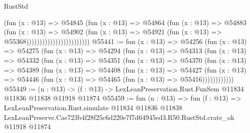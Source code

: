 \begin{lexlean}{RustStd}
\begin{coremodule}
                                        (fun (x : @13) =>
                                        @54845
                                          (fun (x : @13) =>
                                          @54864
                                            (fun (x : @13) =>
                                            @54883
                                              (fun (x : @13) =>
                                              @54902
                                                (fun (x : @13) =>
                                                @54921
                                                  (fun (x : @13) => @55368))))))))))))))))))))))))
@55441 := fun (x : @13) =>
  @54256
    (fun (x : @13) =>
    @54275
      (fun (x : @13) =>
      @54294
        (fun (x : @13) =>
        @54313
          (fun (x : @13) =>
          @54332
            (fun (x : @13) =>
            @54351
              (fun (x : @13) =>
              @54370
                (fun (x : @13) =>
                @54389
                  (fun (x : @13) =>
                  @54408
                    (fun (x : @13) =>
                    @54427
                      (fun (x : @13) =>
                      @54446 (fun (x : @13) => @54465 (fun (x : @13) => @55416))))))))))))
@55449 := (n : @13) ->
  (f : @13) -> LexLeanPreservation.Rust.FunSem @11834 @11836 @11838 @11918 @11874
@55459 := fun (n : @13) =>
  fun (f : @13) =>
  LexLeanPreservation.Rust.simulate
    @11834
    @11836
    @11838
    LexLeanPreserve.Cae723b4f28f25c6d220e7f7d64945ed3.R50.RustStd.crate_ok
    @11918
    @11874
\end{coremodule}
\end{lexlean}
